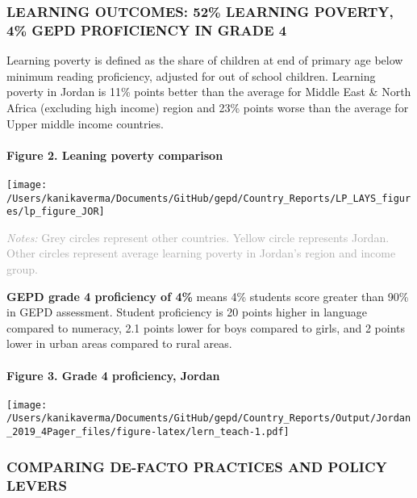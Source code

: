 \documentclass[
  twocolumn]{article}
\begin{document}
\hypertarget{learning-outcomes-52-learning-poverty-4-gepd-proficiency-in-grade-4}{%
\subsubsection{\texorpdfstring{\textbf{LEARNING OUTCOMES: 52\% LEARNING
POVERTY, 4\% GEPD PROFICIENCY IN GRADE
4}}{LEARNING OUTCOMES: 52\% LEARNING POVERTY, 4\% GEPD PROFICIENCY IN GRADE 4}}\label{learning-outcomes-52-learning-poverty-4-gepd-proficiency-in-grade-4}}

Learning poverty is defined as the share of children at end of primary
age below minimum reading proficiency, adjusted for out of school
children. Learning poverty in Jordan is 11\% points better than the
average for Middle East \& North Africa (excluding high income) region
and 23\% points worse than the average for Upper middle income
countries.

\hypertarget{figure-2.-leaning-poverty-comparison}{%
\paragraph{Figure 2. Leaning poverty
comparison}\label{figure-2.-leaning-poverty-comparison}}

\texttt{[image: /Users/kanikaverma/Documents/GitHub/gepd/Country\_Reports/LP\_LAYS\_figures/lp\_figure\_JOR]}

{\scriptsize
    \textcolor{darkgray}{\textit{Notes:} Grey circles represent other countries. Yellow circle represents Jordan. Other circles represent average learning poverty in Jordan's region and income group.}
  }

\textbf{GEPD grade 4 proficiency of 4\%} means 4\% students score
greater than 90\% in GEPD assessment. Student proficiency is 20 points
higher in language compared to numeracy, 2.1 points lower for boys
compared to girls, and 2 points lower in urban areas compared to rural
areas. \vfill\null

\hypertarget{figure-3.-grade-4-proficiency-jordan}{%
\paragraph{Figure 3. Grade 4 proficiency,
Jordan}\label{figure-3.-grade-4-proficiency-jordan}}

\texttt{[image: /Users/kanikaverma/Documents/GitHub/gepd/Country\_Reports/Output/Jordan\_2019\_4Pager\_files/figure-latex/lern\_teach-1.pdf]}

\hypertarget{comparing-de-facto-practices-and-policy-levers}{%
\subsubsection{\texorpdfstring{\textbf{COMPARING DE-FACTO PRACTICES AND
POLICY
LEVERS}}{COMPARING DE-FACTO PRACTICES AND POLICY LEVERS}}\label{comparing-de-facto-practices-and-policy-levers}}
\end{document}
